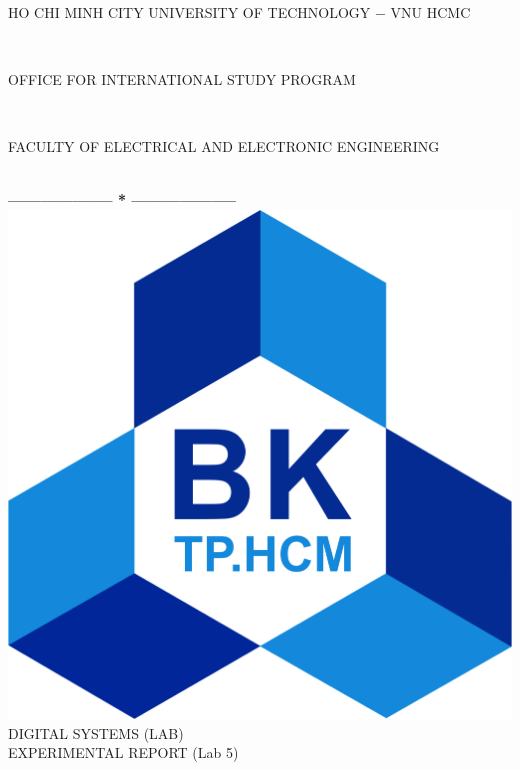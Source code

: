\documentclass[13pt,a4paper]{report}
\begin{document}
\fontsize{13pt}{18pt}\selectfont
\begin{titlepage}
\thispagestyle{empty}
\thisfancypage{%
\setlength{\fboxsep}{0pt}%
\fbox}{} %
\

\begin{center}
\begin{large}
HO CHI MINH CITY UNIVERSITY OF TECHNOLOGY $-$ VNU HCMC
\end{large} \\
\begin{large}
OFFICE FOR INTERNATIONAL STUDY PROGRAM
\end{large} \\
\begin{large}
FACULTY OF ELECTRICAL AND ELECTRONIC ENGINEERING
\end{large} \\
\textbf{--------------------  *  --------------------}\\[4cm]
\includegraphics[scale=0.1]{logobk.png}\\[1cm]
{\fontsize{20pt}{1}\selectfont DIGITAL SYSTEMS (LAB)}\\
{\fontsize{20pt}{1}\selectfont EXPERIMENTAL REPORT (Lab 5)}\\[2.5cm]
\end{center}


\end{titlepage}
\end{document}
